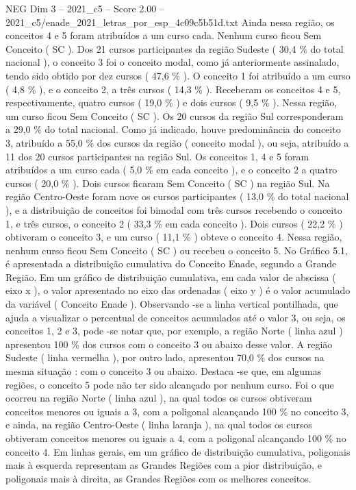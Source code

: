 \begin{textsample}{NEG Dim 3 – 2021\_c5 – Score 2.00 – 2021\_c5/enade\_2021\_letras\_por\_esp\_4c09c5b51d.txt}
Ainda nessa região, os conceitos 4 e 5 foram atribuídos a um curso cada.
Nenhum curso ficou Sem Conceito ( SC ).
Dos 21 cursos participantes da região Sudeste ( 30,4 \% do total nacional ), o conceito 3 foi o conceito modal, como já anteriormente assinalado, tendo sido obtido por dez cursos ( 47,6 \% ).
O conceito 1 foi atribuído a um curso ( 4,8 \% ), e o conceito 2, a três cursos ( 14,3 \% ).
Receberam os conceitos 4 e 5, respectivamente, quatro cursos ( 19,0 \% ) e dois cursos ( 9,5 \% ).
Nessa região, um curso ficou Sem Conceito ( SC ).
Os 20 cursos da região Sul corresponderam a 29,0 \% do total nacional.
Como já indicado, houve predominância do conceito 3, atribuído a 55,0 \% dos cursos da região ( conceito modal ), ou seja, atribuído a 11 dos 20 cursos participantes na região Sul.
Os conceitos 1, 4 e 5 foram atribuídos a um curso cada ( 5,0 \% em cada conceito ), e o conceito 2 a quatro cursos ( 20,0 \% ).
Dois cursos ficaram Sem Conceito ( SC ) na região Sul.
Na região Centro-Oeste foram nove os cursos participantes ( 13,0 \% do total nacional ), e a distribuição de conceitos foi bimodal com três cursos recebendo o conceito 1, e três cursos, o conceito 2 ( 33,3 \% em cada conceito ).
Dois cursos ( 22,2 \% ) obtiveram o conceito 3, e um curso ( 11,1 \% ) obteve o conceito 4.
Nessa região, nenhum curso ficou Sem Conceito ( SC ) ou recebeu o conceito 5.
No Gráfico 5.1, é apresentada a distribuição cumulativa do Conceito Enade, segundo a Grande Região.
Em um gráfico de distribuição cumulativa, em cada valor de abscissa ( eixo x ), o valor apresentado no eixo das ordenadas ( eixo y ) é o valor acumulado da variável ( Conceito Enade ).
Observando -se a linha vertical pontilhada, que ajuda a visualizar o percentual de conceitos acumulados até o valor 3, ou seja, os conceitos 1, 2 e 3, pode -se notar que, por exemplo, a região Norte ( linha azul ) apresentou 100 \% dos cursos com o conceito 3 ou abaixo desse valor.
A região Sudeste ( linha vermelha ), por outro lado, apresentou 70,0 \% dos cursos na mesma situação : com o conceito 3 ou abaixo.
Destaca -se que, em algumas regiões, o conceito 5 pode não ter sido alcançado por nenhum curso.
Foi o que ocorreu na região Norte ( linha azul ), na qual todos os cursos obtiveram conceitos menores ou iguais a 3, com a poligonal alcançando 100 \% no conceito 3, e ainda, na região Centro-Oeste ( linha laranja ), na qual todos os cursos obtiveram conceitos menores ou iguais a 4, com a poligonal alcançando 100 \% no conceito 4.
Em linhas gerais, em um gráfico de distribuição cumulativa, poligonais mais à esquerda representam as Grandes Regiões com a pior distribuição, e poligonais mais à direita, as Grandes Regiões com os melhores conceitos.

\end{textsample}
